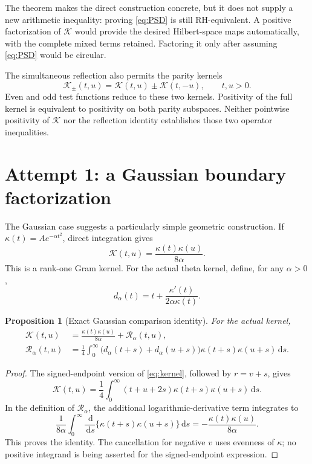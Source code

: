 \documentclass[11pt,letterpaper]{article}
\newtheorem{proposition}[theorem]{Proposition}
\theoremstyle{remark}\newtheorem{remark}[theorem]{Remark}
\newcommand{\K}{\mathcal K}\newcommand{\dd}{\,\mathrm d}
\numberwithin{equation}{section}
\begin{document}
The theorem makes the direct construction concrete, but it does not supply a new arithmetic inequality: proving \eqref{eq:PSD} is still RH-equivalent. A positive factorization of $\K$ would provide the desired Hilbert-space maps automatically, with the complete mixed terms retained. Factoring it only after assuming \eqref{eq:PSD} would be circular.

The simultaneous reflection also permits the parity kernels
\[
\K_\pm(t,u)=\K(t,u)\pm\K(t,-u),\qquad t,u>0.
\]
Even and odd test functions reduce to these two kernels. Positivity of the full kernel is equivalent to positivity on both parity subspaces. Neither pointwise positivity of $\K$ nor the reflection identity establishes those two operator inequalities.

\section{Attempt 1: a Gaussian boundary factorization}

The Gaussian case suggests a particularly simple geometric construction. If $\kappa(t)=A e^{-\alpha t^2}$, direct integration gives
\begin{equation}\label{eq:gaussian}
\K(t,u)=\frac{\kappa(t)\kappa(u)}{8\alpha}.
\end{equation}
This is a rank-one Gram kernel. For the actual theta kernel, define, for any $\alpha>0$,
\[
d_\alpha(t)=t+\frac{\kappa'(t)}{2\alpha\kappa(t)}.
\]
\begin{proposition}[Exact Gaussian comparison identity]\label{prop:gauss}
For the actual kernel,
\begin{align}\label{eq:gaussian-remainder}
\K(t,u)&=\frac{\kappa(t)\kappa(u)}{8\alpha}+\mathcal R_\alpha(t,u),\\
\mathcal R_\alpha(t,u)
&=\frac14\int_0^\infty
\bigl(d_\alpha(t+s)+d_\alpha(u+s)\bigr)
\kappa(t+s)\kappa(u+s)\dd s.\nonumber
\end{align}
\end{proposition}
\begin{proof}
The signed-endpoint version of \eqref{eq:kernel}, followed by $r=v+s$, gives
\[
\K(t,u)=\frac14\int_0^\infty(t+u+2s)\kappa(t+s)\kappa(u+s)\dd s.
\]
In the definition of $\mathcal R_\alpha$, the additional logarithmic-derivative term integrates to
\[
\frac1{8\alpha}\int_0^\infty\frac{\dd}{\dd s}
\{\kappa(t+s)\kappa(u+s)\}\dd s
=-\frac{\kappa(t)\kappa(u)}{8\alpha}.
\]
This proves the identity. The cancellation for negative $v$ uses evenness of $\kappa$; no positive integrand is being asserted for the signed-endpoint expression.
\end{proof}
\end{document}
